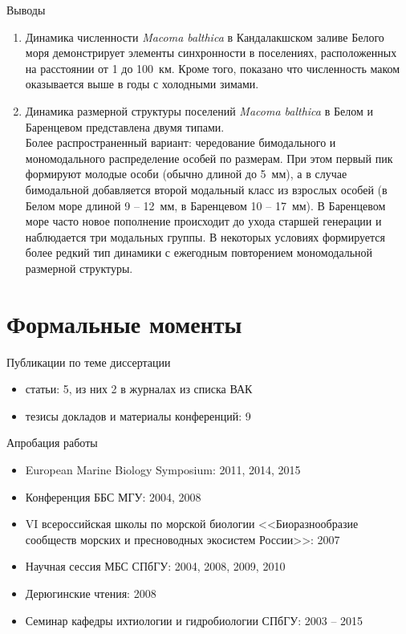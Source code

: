\documentclass{beamer}
\begin{document}
\begin{small}
\begin{frame}{Выводы}
	\begin{enumerate}
\addtocounter{enumi}{7}
		\item Динамика численности {\it Macoma balthica} в Кандалакшском заливе Белого моря демонстрирует элементы синхронности в поселениях, расположенных на расстоянии от 1 до 100~км. Кроме того, показано что численность маком оказывается выше в годы с холодными зимами.
		      \pause
		\item Динамика размерной структуры поселений {\it Macoma balthica} в Белом и Баренцевом представлена двумя типами. \\
Более распространенный вариант: чередование бимодального и мономодального распределение особей по размерам. При этом первый пик формируют молодые особи (обычно длиной до 5~мм), а в случае бимодальной добавляется второй модальный класс из взрослых особей (в Белом море длиной 9 -- 12~мм, в Баренцевом 10 -- 17~мм). В Баренцевом море часто новое пополнение происходит до ухода старшей генерации и наблюдается три модальных группы. 
В некоторых условиях формируется более редкий тип динамики с ежегодным повторением мономодальной размерной структуры.
	\end{enumerate}
\end{frame}

\end{small}

\appendix
		\section*{Формальные моменты}
\begin{frame}{Публикации по теме диссертации}
\begin{itemize}
	\item{статьи: 5, из них 2 в журналах из списка ВАК}
	\item{тезисы докладов и материалы конференций: 9}
\end{itemize}
\end{frame}


\begin{frame}{Апробация работы}
\begin{itemize}
	\item{European Marine Biology Symposium: 2011, 2014, 2015}
	\item{Конференция ББС МГУ: 2004, 2008}
	\item{VI всероссийская школы по морской биологии <<Биоразнообразие сообществ морских и пресноводных экосистем России>>: 2007}
	\item{Научная сессия МБС СПбГУ: 2004, 2008, 2009, 2010}
	\item{Дерюгинские чтения: 2008}
	\item{Семинар кафедры ихтиологии и гидробиологии СПбГУ: 2003 -- 2015}
\end{itemize}
\end{frame}
\end{document}
